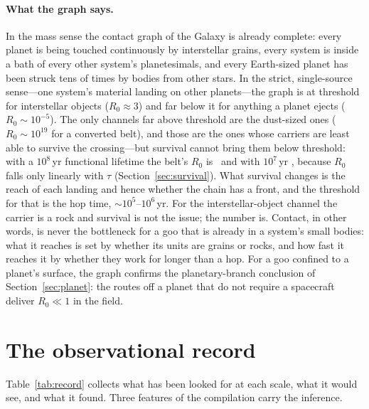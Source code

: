\documentclass[11pt]{article}
\begin{document}
\paragraph{What the graph says.}  In the mass sense the contact graph of the
Galaxy is already complete: every planet is being touched continuously by
interstellar grains, every system is inside a bath of every other system's
planetesimals, and every Earth-sized planet has been struck tens of times by
bodies from other stars.  In the strict, single-source sense---one system's
material landing on other planets---the graph is at threshold for
interstellar objects ($R_{0}\approx3$) and far below it for anything a planet
ejects ($R_{0}\sim10^{-5}$).  The only channels far above threshold are the
dust-sized ones ($R_{0}\sim10^{19}$ for a converted belt), and those are the
ones whose carriers are least able to survive the crossing---but survival
cannot bring them below threshold: with a $10^{8}$\,yr functional lifetime the
belt's $R_{0}$ is \GrainRZeroFuncHundredMyr\ and with $10^{7}$\,yr
\GrainRZeroFuncTenMyr, because $R_{0}$ falls only linearly with $\tau$
(Section~\ref{sec:survival}).  What survival changes is the reach of each
landing and hence whether the chain has a front, and the threshold for that
is the hop time, $\sim10^{5}$--$10^{6}$\,yr.  For the interstellar-object
channel the carrier is a rock and survival is not the issue; the number is.
Contact, in other words, is never the bottleneck for a goo that is already in
a system's small bodies: what it reaches is set by whether its units are
grains or rocks, and how fast it reaches it by whether they work for longer
than a hop.  For a goo confined to a planet's surface, the graph confirms the
planetary-branch conclusion of Section~\ref{sec:planet}: the routes off a
planet that do not require a spacecraft deliver $R_{0}\ll1$ in the field.

\section{The observational record}
\label{sec:record}

Table~\ref{tab:record} collects what has been looked for at each scale, what
it would see, and what it found.  Three features of the compilation carry the
inference.
\end{document}
